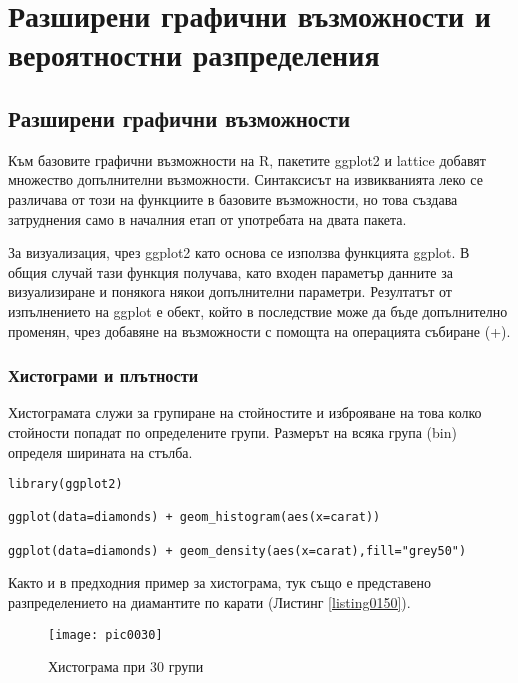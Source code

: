 \newpage
\chapter{Разширени графични възможности и вероятностни разпределения}
\label{chapter08}

\section{Разширени графични възможности}

Към базовите графични възможности на R, пакетите ggplot2 и lattice добавят множество допълнителни възможности. Синтаксисът на извикванията леко се различава от този на функциите в базовите възможности, но това създава затруднения само в началния етап от употребата на двата пакета. 

За визуализация, чрез ggplot2 като основа се използва функцията ggplot. В общия случай тази функция получава, като входен параметър данните за визуализиране и понякога някои допълнителни параметри. Резултатът от изпълнението на ggplot е обект, който в последствие може да бъде допълнително променян, чрез добавяне на възможности с помощта на операцията събиране (+). 

\subsection{Хистограми и плътности}

Хистограмата служи за групиране на стойностите и изброяване на това колко стойности попадат по определените групи. Размерът на всяка група (bin) определя ширината на стълба. 

\begin{lstlisting}[caption=Хистограма и плътност, label=listing0150]
library(ggplot2)

ggplot(data=diamonds) + geom_histogram(aes(x=carat))

ggplot(data=diamonds) + geom_density(aes(x=carat),fill="grey50")
\end{lstlisting}

Както и в предходния пример за хистограма, тук също е представено разпределението на диамантите по карати (Листинг \ref{listing0150}).

\begin{figure}[h!]
  \centering
  \texttt{[image: pic0030]}
  \caption{Хистограма при 30 групи}
\label{figure0030}
\end{figure}
\FloatBarrier

